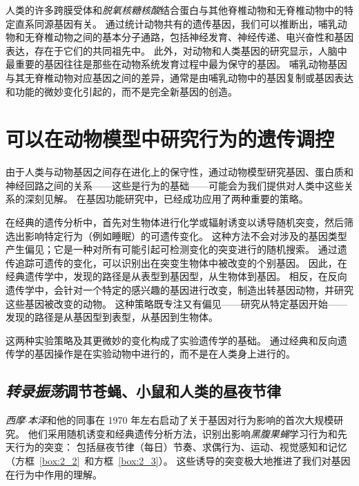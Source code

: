 人类的许多跨膜受体和\textit{脱氧核糖核酸}结合蛋白与其他脊椎动物和无脊椎动物中的特定直系同源基因有关。
通过统计动物共有的遗传基因，我们可以推断出，哺乳动物和无脊椎动物之间的基本分子通路，包括神经发育、神经传递、电兴奋性和基因表达，存在于它们的共同祖先中。
此外，对动物和人类基因的研究显示，人脑中最重要的基因往往是那些在动物系统发育过程中最为保守的基因。
哺乳动物基因与其无脊椎动物对应基因之间的差异，通常是由哺乳动物中的基因复制或基因表达和功能的微妙变化引起的，而不是完全新基因的创造。



\section{可以在动物模型中研究行为的遗传调控}

由于人类与动物基因之间存在进化上的保守性，通过动物模型研究基因、蛋白质和神经回路之间的关系——这些是行为的基础——可能会为我们提供对人类中这些关系的深刻见解。
在基因功能研究中，已经成功应用了两种重要的策略。


在经典的遗传分析中，首先对生物体进行化学或辐射诱变以诱导随机突变，然后筛选出影响特定行为（例如睡眠）的可遗传变化。
这种方法不会对涉及的基因类型产生偏见；它是一种对所有可能引起可检测变化的突变进行的随机搜索。 
通过遗传追踪可遗传的变化，可以识别出在突变生物体中被改变的个别基因。
因此，在经典遗传学中，发现的路径是从表型到基因型，从生物体到基因。
相反，在反向遗传学中，会针对一个特定的感兴趣的基因进行改变，制造出转基因动物，并研究这些基因被改变的动物。
这种策略既专注又有偏见——研究从特定基因开始——发现的路径是从基因型到表型，从基因到生物体。

这两种实验策略及其更微妙的变化构成了实验遗传学的基础。
通过经典和反向遗传学的基因操作是在实验动物中进行的，而不是在人类身上进行的。



\subsection{\textit{转录振荡}调节苍蝇、小鼠和人类的昼夜节律}

\textit{西摩$\cdot$本泽}和他的同事在 1970 年左右启动了关于基因对行为影响的首次大规模研究。
他们采用随机诱变和经典遗传分析方法，识别出影响\textit{黑腹果蝇}学习行为和先天行为的突变：
包括昼夜节律（每日）节奏、求偶行为、运动、视觉感知和记忆（方框~\ref{box:2_2}~和方框~\ref{box:2_3}）。
这些诱导的突变极大地推进了我们对基因在行为中作用的理解。



